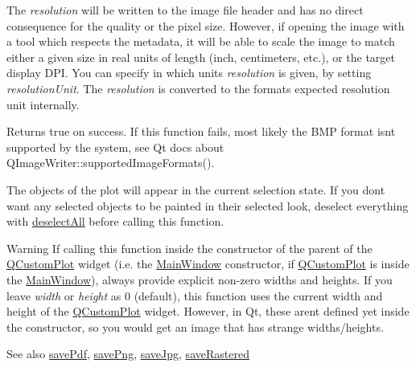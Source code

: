 The {\itshape resolution} will be written to the image file header and has no direct consequence for the quality or the pixel size. However, if opening the image with a tool which respects the metadata, it will be able to scale the image to match either a given size in real units of length (inch, centimeters, etc.), or the target display D\+PI. You can specify in which units {\itshape resolution} is given, by setting {\itshape resolution\+Unit}. The {\itshape resolution} is converted to the format\textquotesingle{}s expected resolution unit internally.

Returns true on success. If this function fails, most likely the B\+MP format isn\textquotesingle{}t supported by the system, see Qt docs about Q\+Image\+Writer\+::supported\+Image\+Formats().

The objects of the plot will appear in the current selection state. If you don\textquotesingle{}t want any selected objects to be painted in their selected look, deselect everything with \hyperlink{classQCustomPlot_a9d4808ab925b003054085246c92a257c}{deselect\+All} before calling this function.

\begin{DoxyWarning}{Warning}
If calling this function inside the constructor of the parent of the \hyperlink{classQCustomPlot}{Q\+Custom\+Plot} widget (i.\+e. the \hyperlink{classMainWindow}{Main\+Window} constructor, if \hyperlink{classQCustomPlot}{Q\+Custom\+Plot} is inside the \hyperlink{classMainWindow}{Main\+Window}), always provide explicit non-\/zero widths and heights. If you leave {\itshape width} or {\itshape height} as 0 (default), this function uses the current width and height of the \hyperlink{classQCustomPlot}{Q\+Custom\+Plot} widget. However, in Qt, these aren\textquotesingle{}t defined yet inside the constructor, so you would get an image that has strange widths/heights.
\end{DoxyWarning}
\begin{DoxySeeAlso}{See also}
\hyperlink{classQCustomPlot_ad5acd34f6b39c3516887d7e54fec2412}{save\+Pdf}, \hyperlink{classQCustomPlot_ac92cc9256d12f354b40a4be4600b5fb9}{save\+Png}, \hyperlink{classQCustomPlot_a76f0d278e630a711fa6f48048cfd83e4}{save\+Jpg}, \hyperlink{classQCustomPlot_ad7723ce2edfa270632ef42b03a444352}{save\+Rastered} 
\end{DoxySeeAlso}
